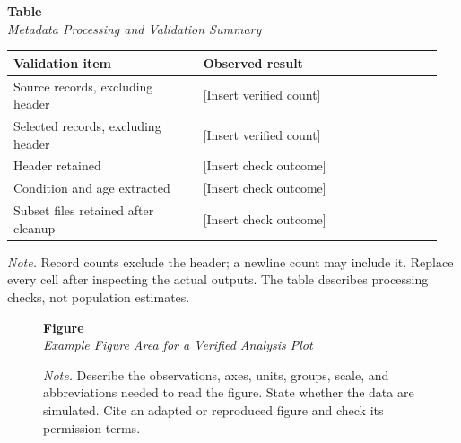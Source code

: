 \documentclass[12pt,letterpaper]{article}
\begin{document}
\begin{table}[H]
\label{tab:validation}
\noindent\textbf{Table \thetable}\\
\noindent\textit{Metadata Processing and Validation Summary}\par
\begin{singlespace}
\smallskip
\begin{tabular}{@{}p{0.42\linewidth}p{0.53\linewidth}@{}}
\toprule
Validation item & Observed result \\
\midrule
Source records, excluding header & [Insert verified count] \\
Selected records, excluding header & [Insert verified count] \\
Header retained & [Insert check outcome] \\
Condition and age extracted & [Insert check outcome] \\
Subset files retained after cleanup & [Insert check outcome] \\
\bottomrule
\end{tabular}
\smallskip
\end{singlespace}
\noindent\textit{Note.} Record counts exclude the header; a newline count may
include it. Replace every cell after inspecting the actual outputs. The table
describes processing checks, not population estimates.
\end{table}

\begin{figure}[H]
\label{fig:example}
\noindent\textbf{Figure \thefigure}\\
\noindent\textit{Example Figure Area for a Verified Analysis Plot}\par
\begin{singlespace}
\smallskip
\noindent{}
\smallskip
\end{singlespace}
\noindent\textit{Note.} Describe the observations, axes, units, groups, scale,
and abbreviations needed to read the figure. State whether the data are
simulated. Cite an adapted or reproduced figure and check its permission terms.
\end{figure}
\end{document}
